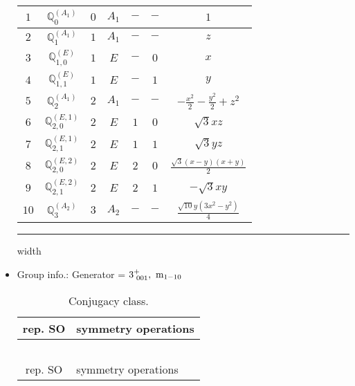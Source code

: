 \documentclass[fleqn,10pt,landscape]{article}
\begin{document}
\begin{itemize}
\begin{center}
\begin{longtable}{ccccccc}
$ 1 $ & $ \mathbb{Q}_{0}^{(A_{1})} $ & $ 0 $ & $ A_{1} $ & $ - $ & $ - $ & $ 1 $ \\ \hline
$ 2 $ & $ \mathbb{Q}_{1}^{(A_{1})} $ & $ 1 $ & $ A_{1} $ & $ - $ & $ - $ & $ z $ \\
$ 3 $ & $ \mathbb{Q}_{1,0}^{(E)} $ & $ 1 $ & $ E $ & $ - $ & $ 0 $ & $ x $ \\
$ 4 $ & $ \mathbb{Q}_{1,1}^{(E)} $ & $ 1 $ & $ E $ & $ - $ & $ 1 $ & $ y $ \\ \hline
$ 5 $ & $ \mathbb{Q}_{2}^{(A_{1})} $ & $ 2 $ & $ A_{1} $ & $ - $ & $ - $ & $ - \frac{x^{2}}{2} - \frac{y^{2}}{2} + z^{2} $ \\
$ 6 $ & $ \mathbb{Q}_{2,0}^{(E,1)} $ & $ 2 $ & $ E $ & $ 1 $ & $ 0 $ & $ \sqrt{3} x z $ \\
$ 7 $ & $ \mathbb{Q}_{2,1}^{(E,1)} $ & $ 2 $ & $ E $ & $ 1 $ & $ 1 $ & $ \sqrt{3} y z $ \\
$ 8 $ & $ \mathbb{Q}_{2,0}^{(E,2)} $ & $ 2 $ & $ E $ & $ 2 $ & $ 0 $ & $ \frac{\sqrt{3} \left(x - y\right) \left(x + y\right)}{2} $ \\
$ 9 $ & $ \mathbb{Q}_{2,1}^{(E,2)} $ & $ 2 $ & $ E $ & $ 2 $ & $ 1 $ & $ - \sqrt{3} x y $ \\ \hline
$ 10 $ & $ \mathbb{Q}_{3}^{(A_{2})} $ & $ 3 $ & $ A_{2} $ & $ - $ & $ - $ & $ \frac{\sqrt{10} y \left(3 x^{2} - y^{2}\right)}{4} $ \\
\end{longtable}
\end{center}

 \hfil \hrule height 1mm width \textwidth \hfil

\item Group info.: Generator = $3^{+}_{\,\,001},\,\,{\rm m}_{1-10}$

\begin{center}
\renewcommand{\arraystretch}{1.3}
\begin{longtable}{c|l}
\caption{Conjugacy class.}
 \\
 \hline \hline
rep. SO & symmetry operations \\ \hline \endfirsthead

\multicolumn{1}{l}{\tablename\ \thetable{}} \\
 \hline \hline
rep. SO & symmetry operations \\ \hline \endhead


\end{longtable}
\end{center}
\end{itemize}
\end{document}
